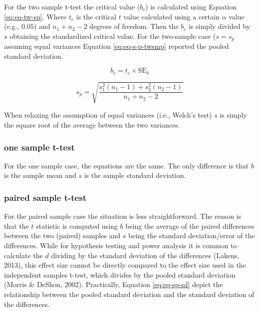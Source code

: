 \documentclass[
  man]{apa7}
\begin{document}
For the two sample t-test the critical value (\(b_c\)) is calculated using Equation \eqref{eq:eq-tw-sp}. Where \(t_c\) is the critical \(t\) value calculated using a certain \(\alpha\) value (e.g., \(0.05\)) and \(n_1 + n_2 - 2\) degrees of freedom. Then the \(b_c\) is simply divided by \(s\) obtaining the standardized critical value. For the two-sample case (\(s = s_p\) assuming equal variances Equation \eqref{eq:eq-s-p-twsmp} reported the pooled standard deviation.

\begin{equation}
    \label{eq:eq-tw-sp}
    b_c = t_c \times \text{SE}_{b}
\end{equation}

\begin{equation}
    \label{eq:eq-s-p-twsmp}
    s_p = \sqrt{\frac{s_1^2 (n_1 - 1) + s_2^2 (n_2 - 1)}{n_1 + n_2 - 2}}
\end{equation}

When relaxing the assumption of equal variances (i.e., Welch's test) \(s\) is simply the square root of the average between the two variances.

\hypertarget{one-sample-t-test}{%
\subsubsection{one sample t-test}\label{one-sample-t-test}}

For the one sample case, the equations are the same. The only difference is that \(b\) is the sample mean and \(s\) is the sample standard deviation.

\hypertarget{paired-sample-t-test}{%
\subsubsection{paired sample t-test}\label{paired-sample-t-test}}

For the paired sample case the situation is less straightforward. The reason is that the \(t\) statistic is computed using \(b\) being the average of the paired differences between the two (paired) samples and \(s\) being the standard deviation/error of the differences. While for hypothesis testing and power analysis it is common to calculate the \(d\) dividing by the standard deviation of the differences (Lakens, 2013), this effect size cannot be directly compared to the effect size used in the independent samples t-test, which divides by the pooled standard deviation (Morris \& DeShon, 2002). Practically, Equation \eqref{eq:eq-sp-sd} depict the relationship between the pooled standard deviation and the standard deviation of the differences.
\end{document}
